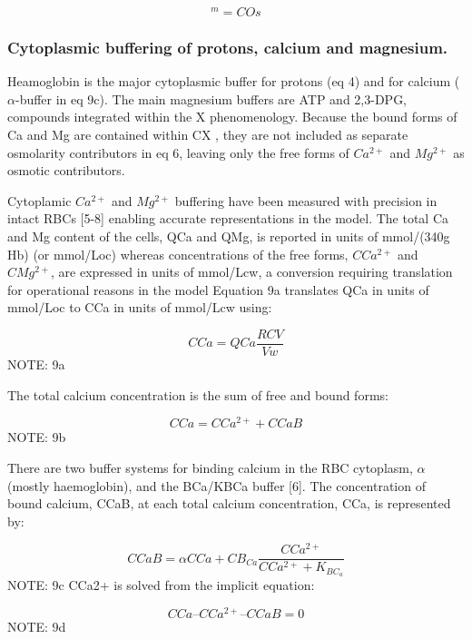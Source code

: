 \documentclass[a4paper]{article}
\newcommand{\med}[1]{[#1]^m}
\newcommand{\cell}[1]{C#1}
\newcommand{\MOs}{\med{Os}}
\newcommand{\KBCa}{K_{{BC}_a}}
\newcommand{\CMgtp}{\cell{Mg^{2+}}}
\newcommand{\CCatp}{\cell{Ca^{2+}}}
\newcommand{\COs}{\cell{Os}}
\newcommand{\CCa}{\cell{Ca}}
\newcommand{\CCaB}{\cell{CaB}}
\newcommand{\CBCa}{\cell{B_{Ca}}}
\newcommand{\QCa}{QCa}
\begin{document}
\begin{equation}
\MOs = \COs
\end{equation}

\subsubsection{Cytoplasmic buffering of protons, calcium and magnesium.}
Heamoglobin is the major cytoplasmic buffer for protons (eq 4) and for calcium ($\alpha$-buffer in eq 9c).  The main magnesium buffers are ATP and 2,3-DPG, compounds integrated within the X  phenomenology.  Because the bound forms of Ca and Mg are contained within CX , they are not included as separate osmolarity contributors in eq 6, leaving only the free forms of $Ca^{2+}$ and $Mg^{2+}$ as osmotic contributors.  

Cytoplamic $Ca^{2+}$ and $Mg^{2+}$ buffering have been measured with precision in intact RBCs [5-8] enabling accurate representations in the model.  The total Ca and Mg content of the cells, QCa and QMg, is reported in units of mmol/(340g Hb) (or mmol/Loc) whereas concentrations of the free forms, $\CCatp$ and $\CMgtp$, are expressed in units of mmol/Lcw, a conversion requiring translation for operational reasons in the model   Equation 9a translates QCa in units of mmol/Loc to CCa in units of mmol/Lcw using:

\begin{equation}
\CCa = \QCa\frac{RCV}{Vw}  
\end{equation}
NOTE: 9a 

The total calcium concentration is the sum of free and bound forms:

\begin{equation}
\CCa = \CCatp + \CCaB
\end{equation}
NOTE: 9b

There are two buffer systems for binding calcium in the RBC cytoplasm, $\alpha$ (mostly haemoglobin), and the BCa/KBCa buffer [6]. The concentration of bound calcium, CCaB, at each total calcium concentration, CCa, is represented by:

\begin{equation}
\CCaB = \alpha\CCa + \CBCa\frac{\CCatp}{\CCatp + \KBCa}
\end{equation}
NOTE: 9c
CCa2+ is solved from the implicit equation: 

\begin{equation}
\CCa – \CCatp – \CCaB = 0  
\end{equation}
NOTE: 9d
\end{document}

